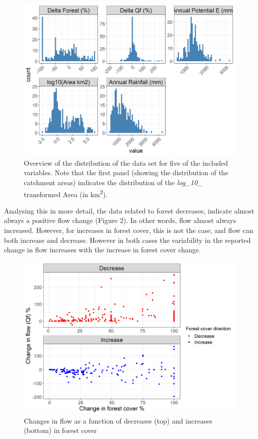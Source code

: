\documentclass[]{elsarticle} %
\begin{document}
\begin{figure}
\includegraphics[width=0.9\linewidth]{./DataExploration} \caption{Overview of the distribution of the data set for five of the included variables. Note that the first panel (showing the distribution of the catchment areas) indicates the distribution of the \emph{log\_10\_} transformed Area (in km\textsuperscript{2}).}\label{fig:datagraphs}
\end{figure}

Analysing this in more detail, the data related to forest decreases, indicate almost always a positive flow change (Figure 2). In other words, flow almost always increased. However, for increases in forest cover, this is not the case, and flow can both increase and decrease. However in both cases the variability in the reported change in flow increases with the increase in forest cover change.

\begin{figure}
\includegraphics[width=0.9\linewidth]{Increase_decrease} \caption{Changes in flow as a function of decreases (top) and increases (bottom) in forest cover}\label{fig:increasedecrease}
\end{figure}
\end{document}

